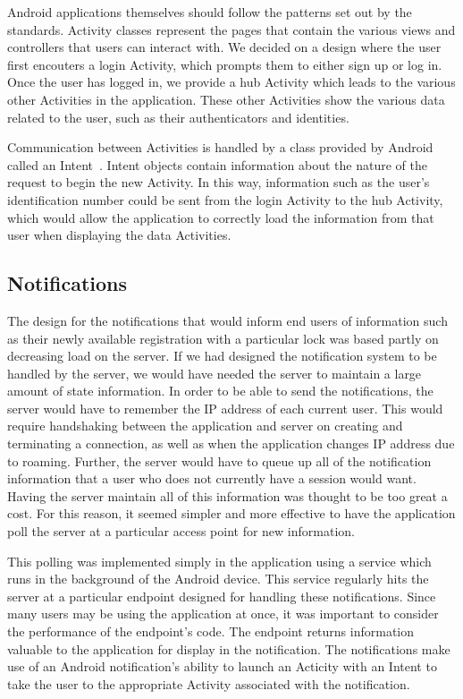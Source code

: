 \documentclass[12pt]{report}
\let\Oldsubsection\subsection
\renewcommand{\subsection}{\FloatBarrier\Oldsubsection}
\begin{document}
Android applications themselves should follow the patterns set out by the standards. Activity classes represent the
pages that contain the various views and controllers that users can interact with. We decided on a design where the user
first encouters a login Activity, which prompts them to either sign up or log in. Once the user has logged in, we
provide a hub Activity which leads to the various other Activities in the application. These other Activities show the
various data related to the user, such as their authenticators and identities.

Communication between Activities is handled by a class provided by Android called an Intent~\autocite{ANDROIDINTENT}. Intent objects contain
information about the nature of the request to begin the new Activity. In this way, information such as the user's
identification number could be sent from the login Activity to the hub Activity, which would allow the application to
correctly load the information from that user when displaying the data Activities.


\subsection{Notifications} \label{notifications}

The design for the notifications that would inform end users of information such as their newly available registration
with a particular lock was based partly on decreasing load on the server. If we had designed the notification system to
be handled by the server, we would have needed the server to maintain a large amount of state information. In order to
be able to send the notifications, the server would have to remember the IP address of each current user. This would
require handshaking between the application and server on creating and terminating a connection, as well as when the
application changes IP address due to roaming. Further, the server would have to queue up all of the notification
information that a user who does not currently have a session would want. Having the server maintain all of this
information was thought to be too great a cost. For this reason, it seemed simpler and more effective to have the
application poll the server at a particular access point for new information.

This polling was implemented simply in the application using a service which runs in the background of the Android
device. This service regularly hits the server at a particular endpoint designed for handling these notifications. Since
many users may be using the application at once, it was important to consider the performance of the endpoint's code.
The endpoint returns information valuable to the application for display in the notification. The notifications make use
of an Android notification's ability to launch an Acticity with an Intent to take the user to the appropriate Activity
associated with the notification.
\end{document}
